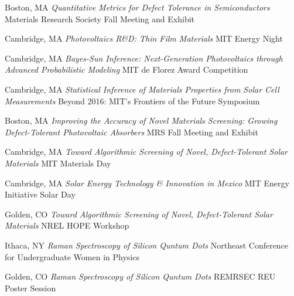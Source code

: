 \vspace{\talkyearsep}
    {Boston, MA}
    {\textit{Quantitative Metrics for Defect Tolerance in Semiconductors}}
    {Materials Research Society Fall Meeting and Exhibit}

\vspace{\talksep}
\datedsubsection{}
    {Cambridge, MA}
    {\textit{Photovoltaics R\&D: Thin Film Materials}}
    {MIT Energy Night}

\vspace{\talksep}
\datedsubsection{}
    {Cambridge, MA}
    {\textit{Bayes-Sun Inference: Next-Generation Photovoltaics through Advanced Probabilistic Modeling}}
    {MIT de Florez Award Competition}

\vspace{\talksep}
\datedsubsection{}
    {Cambridge, MA}
    {\textit{Statistical Inference of Materials Properties from Solar Cell Measurements}}
    {Beyond 2016: MIT’s Frontiers of the Future Symposium}

\vspace{\talkyearsep}
    {Boston, MA}
    {\textit{Improving the Accuracy of Novel Materials Screening: Growing Defect-Tolerant Photovoltaic Absorbers}}
    {MRS Fall Meeting and Exhibit}

\vspace{\talksep}
\datedsubsection{}
    {Cambridge, MA}
    {\textit{Toward Algorithmic Screening of Novel, Defect-Tolerant Solar Materials}}
    {MIT Materials Day}

\vspace{\talksep}
\datedsubsection{}
    {Cambridge, MA}
    {\textit{Solar Energy Technology \& Innovation in Mexico}}
    {MIT Energy Initiative Solar Day}

\vspace{\talksep}
\datedsubsection{}
    {Golden, CO}
    {\textit{Toward Algorithmic Screening of Novel, Defect-Tolerant Solar Materials}}
    {NREL HOPE Workshop}

\vspace{\talkyearsep}
    {Ithaca, NY}
    {\textit{Raman Spectroscopy of Silicon Quntum Dots}}
    {Northeast Conference for Undergraduate Women in Physics}

\vspace{\talkyearsep}
    {Golden, CO}
    {\textit{Raman Spectroscopy of Silicon Quntum Dots}}
    {REMRSEC REU Poster Session}
